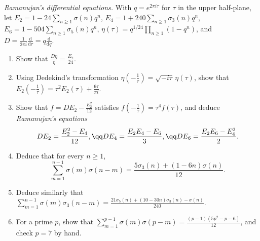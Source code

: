 \begin{exercise}[$\star\star\star$]\label{pb:ramanujanE2}
\emph{Ramanujan's differential equations.} With $q=e^{2\pi i\tau}$ for $\tau$ in the upper half-plane, let $E_2=1-24\sum_{n\ge1}\sigma(n)q^n$, $E_4=1+240\sum_{n\ge1}\sigma_3(n)q^n$,
$E_6=1-504\sum_{n\ge1}\sigma_5(n)q^n$, $\eta(\tau)=q^{1/24}\prod_{n\ge1}(1-q^n)$, and $D=\frac1{2\pi i}\frac{\mathrm d}{\mathrm d\tau}=q\frac{\mathrm d}{\mathrm dq}$.
\begin{enumerate}[label=(\alph*)]
\item Show that $\frac{D\eta}\eta=\frac{E_2}{24}$.
\item Using Dedekind's transformation $\eta(-\frac1\tau)=\sqrt{-i\tau}\,\eta(\tau)$, show that $E_2(-\frac1\tau)=\tau^2E_2(\tau)+\frac{6\tau}{\pi i}$.
\item Show that $f=DE_2-\frac{E_2^2}{12}$ satisfies $f(-\frac1\tau)=\tau^4f(\tau)$, and deduce \emph{Ramanujan's equations}
\[
DE_2=\frac{E_2^2-E_4}{12},\qq DE_4=\frac{E_2E_4-E_6}3,\qq DE_6=\frac{E_2E_6-E_4^2}2.
\]
\item Deduce that for every $n\ge1$,
\[
\sum_{m=1}^{n-1}\sigma(m)\sigma(n-m)=\frac{5\sigma_3(n)+(1-6n)\sigma(n)}{12}.
\]
\item Deduce similarly that $\sum_{m=1}^{n-1}\sigma(m)\sigma_3(n-m)=\frac{21\sigma_5(n)+(10-30n)\sigma_3(n)-\sigma(n)}{240}$.
\item For a prime $p$, show that $\sum_{m=1}^{p-1}\sigma(m)\sigma(p-m)=\frac{(p-1)(5p^2-p-6)}{12}$, and check $p=7$ by hand.
\end{enumerate}
\end{exercise}

